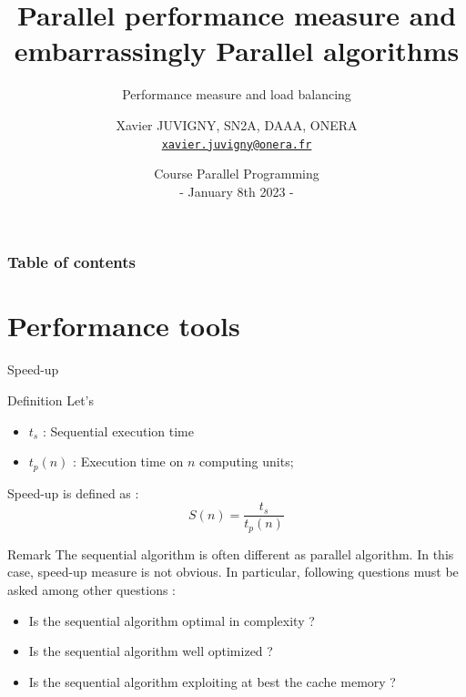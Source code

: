 \documentclass[compress,10pt,aspectratio=169]{beamer}
\title[Parallel programming\hspace{2em}]{Parallel performance measure and embarrassingly Parallel algorithms}
\subtitle{Performance measure and load balancing}
\author[X. JUVIGNY]{Xavier JUVIGNY, SN2A, DAAA, ONERA\\ \href{mailto:xavier.juvigny@onera.fr}{\texttt{xavier.juvigny@onera.fr}} }
\date[01/08/2023]{Course Parallel Programming\\- January 8th 2023 -}
\institute{\inst{1}ONERA,\inst{2}DAAA}
\begin{document}
\MakeTitlePage

\begin{frame}
\frametitle{Table of contents}
\begin{multicols}{2}
\tableofcontents[hideallsubsections]
\end{multicols}
\end{frame}

\section{Performance tools}

\begin{frame}{Speed-up}
    \scriptsize
    \begin{block}{Definition}
        Let's
        \begin{itemize}
        \item $t_{s}$ : Sequential execution time
        \item $t_{p}(n)$ : Execution time on $n$ computing units;
        \end{itemize}

        Speed-up is defined as :        
        \begin{equation}
         S(n) = \frac{t_{s}}{t_{p}(n)}
        \end{equation}
    \end{block}
        
    \begin{alertblock}{Remark}
        The sequential algorithm is often different as parallel algorithm. In this case,
        speed-up measure is not obvious. In particular, following questions must be 
        asked among other questions :
        \begin{itemize}
            \item Is the sequential algorithm optimal in complexity ?
            \item Is the sequential algorithm well optimized ?
            \item Is the sequential algorithm exploiting at best the cache memory ?
        \end{itemize} 
    \end{alertblock}
        
\end{frame}
\end{document}
